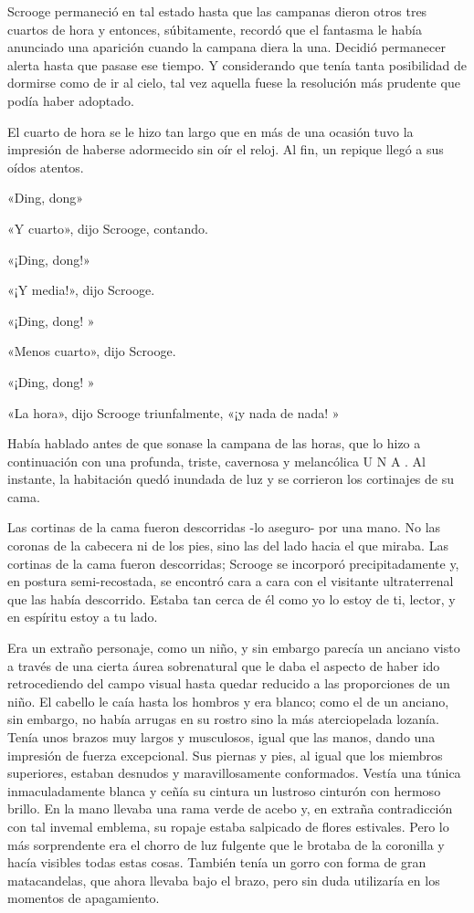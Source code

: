 \documentclass{novela}
\begin{document}
 Scrooge permaneció en tal estado hasta que las campanas dieron otros tres cuartos de hora y entonces, súbitamente, recordó que el fantasma le había anunciado una aparición cuando la campana diera la una. Decidió permanecer alerta hasta que pasase ese tiempo. Y considerando que tenía tanta posibilidad de dormirse como de ir al cielo, tal vez aquella fuese la resolución más prudente que podía haber adoptado.

 El cuarto de hora se le hizo tan largo que en más de una ocasión tuvo la impresión de haberse adormecido sin oír el reloj. Al fin, un repique llegó a sus oídos atentos.

 «Ding, dong»

 «Y cuarto», dijo Scrooge, contando.

 «¡Ding, dong!»

 «¡Y media!», dijo Scrooge.





 «¡Ding, dong! »

 «Menos cuarto», dijo Scrooge.

 «¡Ding, dong! »

 «La hora», dijo Scrooge triunfalmente, «¡y nada de nada! »

 Había hablado antes de que sonase la campana de las horas, que lo hizo a continuación con una profunda, triste, cavernosa y melancólica U N A . Al instante, la habitación quedó inundada de luz y se corrieron los cortinajes de su cama.

 Las cortinas de la cama fueron descorridas -lo aseguro- por una mano. No las coronas de la cabecera ni de los pies, sino las del lado hacia el que miraba. Las cortinas de la cama fueron descorridas; Scrooge se incorporó precipitadamente y, en postura semi-recostada, se encontró cara a cara con el visitante ultraterrenal que las había descorrido. Estaba tan cerca de él como yo lo estoy de ti, lector, y en espíritu estoy a tu lado.

 Era un extraño personaje, como un niño, y sin embargo parecía un anciano visto a través de una cierta áurea sobrenatural que le daba el aspecto de haber ido retrocediendo del campo visual hasta quedar reducido a las proporciones de un niño. El cabello le caía hasta los hombros y era blanco; como el de un anciano, sin embargo, no había arrugas en su rostro sino la más aterciopelada lozanía. Tenía unos brazos muy largos y musculosos, igual que las manos, dando una impresión de fuerza excepcional. Sus piernas y pies, al igual que los miembros superiores, estaban desnudos y maravillosamente conformados. Vestía una túnica inmaculadamente blanca y ceñía su cintura un lustroso cinturón con hermoso brillo. En la mano llevaba una rama verde de acebo y, en extraña contradicción con tal invemal emblema, su ropaje estaba salpicado de flores estivales. Pero lo más sorprendente era el chorro de luz fulgente que le brotaba de la coronilla y hacía visibles todas estas cosas. También tenía un gorro con forma de gran matacandelas, que ahora llevaba bajo el brazo, pero sin duda utilizaría en los momentos de apagamiento.
\end{document}
